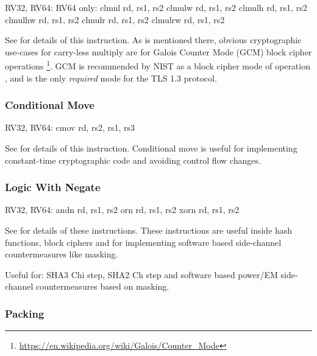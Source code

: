 \begin{cryptobitmanipisa}
RV32, RV64:                         RV64 only:
    clmul rd, rs1, rs2                  clmulw rd, rs1, rs2
    clmulh rd, rs1, rs2                 clmulhw rd, rs1, rs2
    clmulr rd, rs1, rs2                 clmulrw rd, rs1, rs2
\end{cryptobitmanipisa}

See \cite[Section 2.6]{riscv:bitmanip:draft} for details of
this instruction.
As is mentioned there, obvious cryptographic use-cases for carry-less
multiply are for Galois Counter Mode (GCM) block cipher operations
\footnote{\url{https://en.wikipedia.org/wiki/Galois/Counter_Mode}}.
GCM is recommended by NIST as a block cipher mode of operation
\cite{nist:gcm}, and is the only {\em required} mode for the TLS 1.3
protocol.

\subsubsection{Conditional Move}

\begin{cryptobitmanipisa}
RV32, RV64:
    cmov rd, rs2, rs1, rs3
\end{cryptobitmanipisa}

See \cite[Section 2.9.2]{riscv:bitmanip:draft} for details of
this instruction.
Conditional move is useful for implementing constant-time cryptographic
code and avoiding control flow changes.

\subsubsection{Logic With Negate}

\begin{cryptobitmanipisa}
RV32, RV64:
    andn rd, rs1, rs2
     orn rd, rs1, rs2
    xorn rd, rs1, rs2
\end{cryptobitmanipisa}

See \cite[Section 2.1.3]{riscv:bitmanip:draft} for details of
these instructions.
These instructions are useful inside hash functions, block ciphers and
for implementing software based side-channel countermeasures like masking.

Useful for:
SHA3 Chi step,
SHA2 Ch step
and
software based power/EM side-channel countermeasures based on masking.

\subsubsection{Packing}

